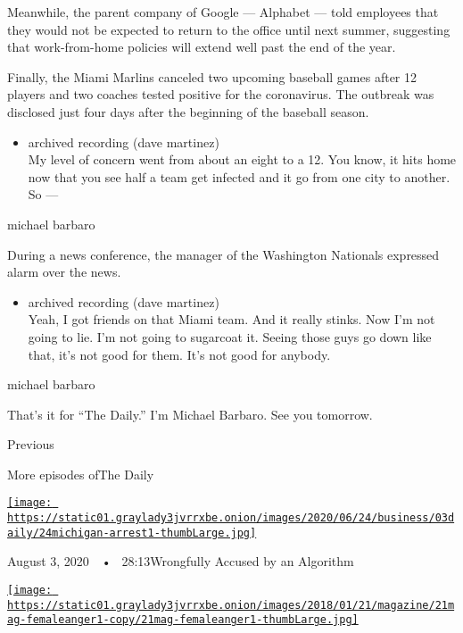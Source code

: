 Meanwhile, the parent company of Google --- Alphabet --- told employees
that they would not be expected to return to the office until next
summer, suggesting that work-from-home policies will extend well past
the end of the year.

Finally, the Miami Marlins canceled two upcoming baseball games after 12
players and two coaches tested positive for the coronavirus. The
outbreak was disclosed just four days after the beginning of the
baseball season.

\begin{itemize}
\tightlist
\item
  archived recording (dave martinez)\\
  My level of concern went from about an eight to a 12. You know, it
  hits home now that you see half a team get infected and it go from one
  city to another. So ---
\end{itemize}

michael barbaro

During a news conference, the manager of the Washington Nationals
expressed alarm over the news.

\begin{itemize}
\tightlist
\item
  archived recording (dave martinez)\\
  Yeah, I got friends on that Miami team. And it really stinks. Now I'm
  not going to lie. I'm not going to sugarcoat it. Seeing those guys go
  down like that, it's not good for them. It's not good for anybody.
\end{itemize}

michael barbaro

That's it for ``The Daily.'' I'm Michael Barbaro. See you tomorrow.

Previous

More episodes ofThe Daily

\href{https://www.nytimes3xbfgragh.onion/2020/08/03/podcasts/the-daily/algorithmic-justice-racism.html?action=click\&module=audio-series-bar\&region=header\&pgtype=Article}{\texttt{[image: https://static01.graylady3jvrrxbe.onion/images/2020/06/24/business/03daily/24michigan-arrest1-thumbLarge.jpg]}}

August 3, 2020~~•~ 28:13Wrongfully Accused by an Algorithm

\href{https://www.nytimes3xbfgragh.onion/2020/08/02/podcasts/the-daily/on-female-rage.html?action=click\&module=audio-series-bar\&region=header\&pgtype=Article}{\texttt{[image: https://static01.graylady3jvrrxbe.onion/images/2018/01/21/magazine/21mag-femaleanger1-copy/21mag-femaleanger1-thumbLarge.jpg]}}

